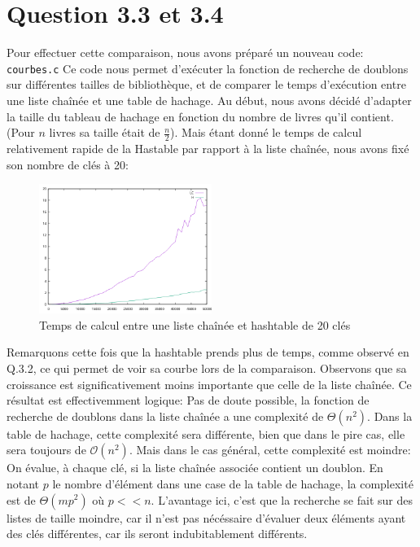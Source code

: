 \documentclass{article}
\begin{document}
    \newpage
    \section{Question 3.3 et 3.4}
    
    Pour effectuer cette comparaison, nous avons préparé un nouveau code: 
    \texttt{courbes.c}
    \newline
    Ce code nous permet d'exécuter la fonction de recherche de doublons sur 
    différentes tailles de bibliothèque, et de comparer le temps d'exécution
    entre une liste chaînée et une table de hachage.
    \newline
    Au début, nous avons décidé d'adapter la taille du tableau de hachage en
    fonction du nombre de livres qu'il contient. (Pour $n$ livres sa taille
    était de $\frac{n}{2}$). 
    \newline
    Mais étant donné le temps de calcul relativement rapide de la Hastable
    par rapport à la liste chaînée, nous avons fixé son nombre de clés à 20:
    \begin{figure}[h]
        \centering
        \includegraphics[width=0.5\textwidth]{graph.png}
        \caption{Temps de calcul entre une liste chaînée et hashtable de 20 clés}
        \label{fig:hash20}
    \end{figure}
    \newline
    Remarquons cette fois que la hashtable prends plus de temps, comme observé
    en Q.3.2, ce qui permet de voir sa courbe lors de la comparaison.
    \newline
    Observons que sa croissance est significativement moins importante que
    celle de la liste chaînée.
    \newline
    Ce résultat est effectivemment logique: Pas de doute possible, la fonction
    de recherche de doublons dans la liste chaînée a une complexité de
    $\Theta(n^2)$. 
    \newline
    Dans la table de hachage, cette complexité sera différente, bien 
    que dans le pire cas, elle sera toujours  de $\mathcal O(n^2)$.
    \newline
    Mais dans le cas général, cette complexité est moindre:
    On évalue, à chaque clé, si la liste chaînée associée contient un doublon.
    En notant $p$ le nombre d'élément dans une case de la table de hachage,
    la complexité est de $\Theta(mp^2)$ où $p << n$.
    \newline
    L'avantage ici, c'est que la recherche se fait sur des listes de taille
    moindre, car il n'est pas nécéssaire d'évaluer deux éléments ayant des clés
    différentes, car ils seront indubitablement différents.


        
\end{document}
